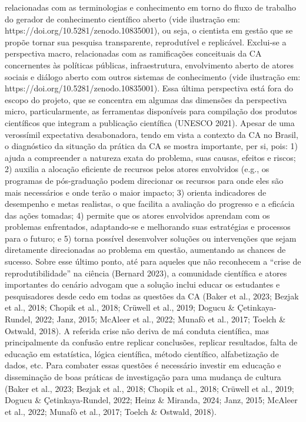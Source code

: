 \documentclass[
  a4paper,
]{article}
\begin{document}
relacionadas com as terminologias e conhecimento em torno do fluxo de
trabalho do gerador de conhecimento científico aberto (vide ilustração
em: https://doi.org/10.5281/zenodo.10835001), ou seja, o cientista em
gestão que se propõe tornar sua pesquisa transparente, reprodutível e
replicável. Exclui-se a perspectiva macro, relacionadas com as
ramificações conceituais da CA concernentes às políticas públicas,
infraestrutura, envolvimento aberto de atores sociais e diálogo aberto
com outros sistemas de conhecimento (vide ilustração em:
https://doi.org/10.5281/zenodo.10835001). Essa última perspectiva está
fora do escopo do projeto, que se concentra em algumas das dimensões da
perspectiva micro, particularmente, as ferramentas disponíveis para
compilação dos produtos científicos que integram a publicação científica
(UNESCO 2021). Apesar de uma verossímil expectativa desabonadora, tendo
em vista a contexto da CA no Brasil, o diagnóstico da situação da
prática da CA se mostra importante, per si, pois: 1) ajuda a compreender
a natureza exata do problema, suas causas, efeitos e riscos; 2) auxilia
a alocação eficiente de recursos pelos atores envolvidos (e.g., os
programas de pós-graduação podem direcionar os recursos para onde eles
são mais necessários e onde terão o maior impacto; 3) orienta
indicadores de desempenho e metas realistas, o que facilita a avaliação
do progresso e a eficácia das ações tomadas; 4) permite que os atores
envolvidos aprendam com os problemas enfrentados, adaptando-se e
melhorando suas estratégias e processos para o futuro; e 5) torna
possível desenvolver soluções ou intervenções que sejam diretamente
direcionadas ao problema em questão, aumentando as chances de sucesso.
Sobre esse último ponto, até para aqueles que não reconhecem a ``crise
de reprodutibilidade'' na ciência (Bernard 2023), a comunidade
científica e atores importantes do cenário advogam que a solução inclui
educar os estudantes e pesquisadores desde cedo em todas as questões da
CA (Baker et al., 2023; Bezjak et al., 2018; Chopik et al., 2018;
Crüwell et al., 2019; Dogucu \& Çetinkaya-Rundel, 2022; Janz, 2015;
McAleer et al., 2022; Munafò et al., 2017; Toelch \& Ostwald, 2018). A
referida crise não deriva de má conduta científica, mas principalmente
da confusão entre replicar conclusões, replicar resultados, falta de
educação em estatística, lógica científica, método científico,
alfabetização de dados, etc. Para combater essas questões é necessário
investir em educação e disseminação de boas práticas de investigação
para uma mudança de cultura (Baker et al., 2023; Bezjak et al., 2018;
Chopik et al., 2018; Crüwell et al., 2019; Dogucu \& Çetinkaya-Rundel,
2022; Heinz \& Miranda, 2024; Janz, 2015; McAleer et al., 2022; Munafò
et al., 2017; Toelch \& Ostwald, 2018).
\end{document}
